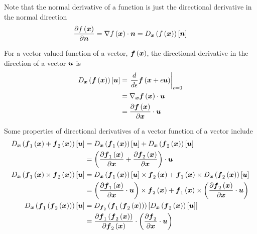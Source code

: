 Note that the normal derivative of a function is just the directional
derivative in the normal direction \ie
\begin{equation}
  \delby{\fnof{f}{\vectr{x}}}{\vectr{n}}=\dotprod{\gradient{}{\fnof{f}{\vectr{x}}}}{\vectr{n}}=\directionalderiv{\vectr{x}}{\fnof{f}{\vectr{x}}}{\vectr{n}}
\end{equation}

For a vector valued function of a vector, $ \boldsymbol{f}\left( \boldsymbol{x} \right) $, the
directional derivative in the direction of a vector $\boldsymbol{u}$ is
\begin{equation}
  \begin{split}
    \directionalderiv{\vectr{x}}{\fnof{\vectr{f}}{\vectr{x}}}{\vectr{u}}&=\evalat{\dfrac{d}{d\epsilon}\fnof{\vectr{f}}{\vectr{x}+\epsilon\vectr{u}}}{\epsilon=0}\\
    &=\dotprod{\gradient{\vectr{x}}{\fnof{\vectr{f}}{\vectr{x}}}}{\vectr{u}}\\
    &=\dotprod{\delby{\fnof{\vectr{f}}{\vectr{x}}}{\vectr{x}}}{\vectr{u}}\\
  \end{split}
\end{equation}

Some properties of directional derivatives of a vector function of a vector include
\begin{equation}
  \begin{split}
    \directionalderiv{\vectr{x}}{\fnof{\vectr{f}_{1}}{\vectr{x}}+\fnof{\vectr{f}_{2}}{\vectr{x}}}{\vectr{u}}&=\directionalderiv{\vectr{x}}{\fnof{\vectr{f}_{1}}{\vectr{x}}}{\vectr{u}}+\directionalderiv{\vectr{x}}{\fnof{\vectr{f}_{2}}{\vectr{x}}}{\vectr{u}}\\
    &=\dotprod{\pbrac{\delby{\fnof{\vectr{f}_{1}}{\vectr{x}}}{\vectr{x}}+\delby{\fnof{\vectr{f}_{2}}{\vectr{x}}}{\vectr{x}}}}{\vectr{u}}\\
    \directionalderiv{\vectr{x}}{\crossprod{\fnof{\vectr{f}_{1}}{\vectr{x}}}{\fnof{\vectr{f}_{2}}{\vectr{x}}}}{\vectr{u}}&=\crossprod{\directionalderiv{\vectr{x}}{\fnof{\vectr{f}_{1}}{\vectr{x}}}{\vectr{u}}}{\fnof{\vectr{f}_{2}}{\vectr{x}}}+\crossprod{\fnof{\vectr{f}_{1}}{\vectr{x}}}{\directionalderiv{\vectr{x}}{\fnof{\vectr{f}_{2}}{\vectr{x}}}{\vectr{u}}}\\
    &=\crossprod{\pbrac{\dotprod{\delby{\fnof{\vectr{f}_{1}}{\vectr{x}}}{\vectr{x}}}{\vectr{u}}}}{\fnof{\vectr{f}_{2}}{\vectr{x}}}+\crossprod{\fnof{\vectr{f}_{1}}{\vectr{x}}}{\pbrac{\dotprod{\delby{\fnof{\vectr{f}_{2}}{\vectr{x}}}{\vectr{x}}}{\vectr{u}}}}\\
    \directionalderiv{\vectr{x}}{\fnof{\vectr{f}_{1}}{\fnof{\vectr{f}_{2}}{\vectr{x}}}}{\vectr{u}}&=\directionalderiv{\vectr{f}_{2}}{\fnof{\vectr{f}_{1}}{\fnof{\vectr{f}_{2}}{\vectr{x}}}}{\directionalderiv{\vectr{x}}{\fnof{\vectr{f}_{2}}{\vectr{x}}}{\vectr{u}}}\\
    &=\dotprod{\delby{\fnof{\vectr{f}_{1}}{\fnof{\vectr{f}_{2}}{\vectr{x}}}}{\fnof{\vectr{f}_{2}}{\vectr{x}}}}{\pbrac{\dotprod{\delby{\vectr{f}_{2}}{\vectr{x}}}{\vectr{u}}}}
  \end{split}
\end{equation}

